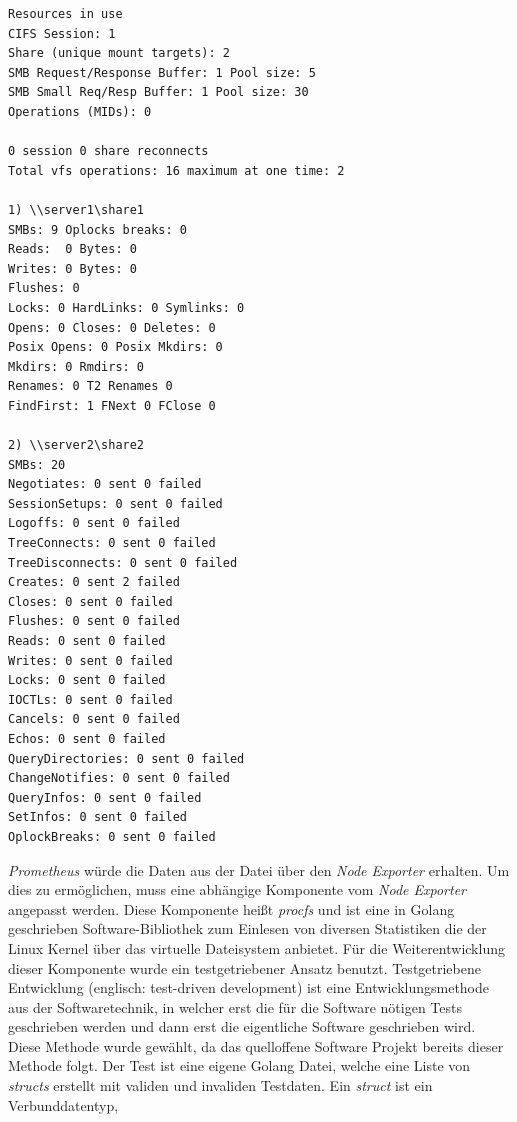 \documentclass[titlepage]{report}
\begin{document}
\begin{minipage}{\linewidth}
\begin{lstlisting}[caption={Beispiel einer /proc/fs/cifs/stats Datei mit
Statistiken zu SMB1 und SMB2 bzw SMB3},label={lst:cifsstats}]
Resources in use
CIFS Session: 1
Share (unique mount targets): 2
SMB Request/Response Buffer: 1 Pool size: 5
SMB Small Req/Resp Buffer: 1 Pool size: 30
Operations (MIDs): 0

0 session 0 share reconnects
Total vfs operations: 16 maximum at one time: 2

1) \\server1\share1
SMBs: 9 Oplocks breaks: 0
Reads:  0 Bytes: 0
Writes: 0 Bytes: 0
Flushes: 0
Locks: 0 HardLinks: 0 Symlinks: 0
Opens: 0 Closes: 0 Deletes: 0
Posix Opens: 0 Posix Mkdirs: 0
Mkdirs: 0 Rmdirs: 0
Renames: 0 T2 Renames 0
FindFirst: 1 FNext 0 FClose 0

2) \\server2\share2
SMBs: 20
Negotiates: 0 sent 0 failed
SessionSetups: 0 sent 0 failed
Logoffs: 0 sent 0 failed
TreeConnects: 0 sent 0 failed
TreeDisconnects: 0 sent 0 failed
Creates: 0 sent 2 failed
Closes: 0 sent 0 failed
Flushes: 0 sent 0 failed
Reads: 0 sent 0 failed
Writes: 0 sent 0 failed
Locks: 0 sent 0 failed
IOCTLs: 0 sent 0 failed
Cancels: 0 sent 0 failed
Echos: 0 sent 0 failed
QueryDirectories: 0 sent 0 failed
ChangeNotifies: 0 sent 0 failed
QueryInfos: 0 sent 0 failed
SetInfos: 0 sent 0 failed
OplockBreaks: 0 sent 0 failed
\end{lstlisting}
\end{minipage}
\emph{Prometheus} würde die Daten aus der 
Datei über den \emph{Node Exporter} erhalten. Um dies zu ermöglichen,
muss eine abhängige Komponente vom \emph{Node Exporter} angepasst
werden. Diese Komponente heißt \emph{procfs} und ist eine in Golang
geschrieben Software\hyp{}Bibliothek zum Einlesen von diversen
Statistiken die der Linux Kernel über das virtuelle Dateisystem
 anbietet. Für die Weiterentwicklung dieser Komponente wurde
ein testgetriebener Ansatz benutzt. Testgetriebene Entwicklung
(englisch: test\hyp{}driven development) ist eine Entwicklungsmethode
aus der Softwaretechnik, in welcher erst die für die Software nötigen
Tests geschrieben werden und dann erst die eigentliche Software
geschrieben wird. Diese Methode wurde gewählt, da das quelloffene
Software Projekt bereits dieser Methode folgt. Der Test ist eine eigene
Golang Datei, welche eine Liste von \emph{structs} erstellt mit validen
und invaliden Testdaten. Ein \emph{struct} ist ein Verbunddatentyp,
\end{document}
